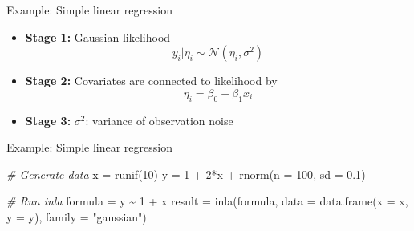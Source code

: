 \documentclass[
  ignorenonframetext,
]{beamer}
\newenvironment{Shaded}{\begin{snugshade}}{\end{snugshade}}
\newcommand{\AttributeTok}[1]{\textcolor[rgb]{0.77,0.63,0.00}{#1}}
\newcommand{\CommentTok}[1]{\textcolor[rgb]{0.56,0.35,0.01}{\textit{#1}}}
\newcommand{\DecValTok}[1]{\textcolor[rgb]{0.00,0.00,0.81}{#1}}
\newcommand{\FloatTok}[1]{\textcolor[rgb]{0.00,0.00,0.81}{#1}}
\newcommand{\FunctionTok}[1]{\textcolor[rgb]{0.00,0.00,0.00}{#1}}
\newcommand{\NormalTok}[1]{#1}
\newcommand{\OtherTok}[1]{\textcolor[rgb]{0.56,0.35,0.01}{#1}}
\newcommand{\SpecialCharTok}[1]{\textcolor[rgb]{0.00,0.00,0.00}{#1}}
\newcommand{\StringTok}[1]{\textcolor[rgb]{0.31,0.60,0.02}{#1}}
\begin{document}
\begin{frame}{Example: Simple linear regression}
\protect\hypertarget{example-simple-linear-regression}{}
\begin{itemize}
\item
  \textbf{Stage 1:} Gaussian likelihood \[
  y_i | \eta_i \sim \mathcal{N}(\eta_i, \sigma^2)
  \]
\item
  \textbf{Stage 2:} Covariates are connected to likelihood by \[
  \eta_i = \beta_0 + \beta_1 x_i
  \]
\item
  \textbf{Stage 3:} \(\sigma^2\): variance of observation noise
\end{itemize}
\end{frame}

\begin{frame}[fragile]{Example: Simple linear regression}
\protect\hypertarget{example-simple-linear-regression-1}{}
\begin{Shaded}
\begin{Highlighting}[]
\CommentTok{\# Generate data}
\NormalTok{x }\OtherTok{=} \FunctionTok{runif}\NormalTok{(}\DecValTok{10}\NormalTok{)}
\NormalTok{y }\OtherTok{=} \DecValTok{1} \SpecialCharTok{+} \DecValTok{2}\SpecialCharTok{*}\NormalTok{x }\SpecialCharTok{+} \FunctionTok{rnorm}\NormalTok{(}\AttributeTok{n =} \DecValTok{100}\NormalTok{, }\AttributeTok{sd =} \FloatTok{0.1}\NormalTok{)}

\CommentTok{\# Run inla}
\NormalTok{formula }\OtherTok{=}\NormalTok{ y }\SpecialCharTok{\textasciitilde{}} \DecValTok{1} \SpecialCharTok{+}\NormalTok{ x}
\NormalTok{result }\OtherTok{=} \FunctionTok{inla}\NormalTok{(formula,}
              \AttributeTok{data =} \FunctionTok{data.frame}\NormalTok{(}\AttributeTok{x =}\NormalTok{ x, }\AttributeTok{y =}\NormalTok{ y),}
              \AttributeTok{family =} \StringTok{"gaussian"}\NormalTok{)}
\end{Highlighting}
\end{Shaded}
\end{frame}
\end{document}
